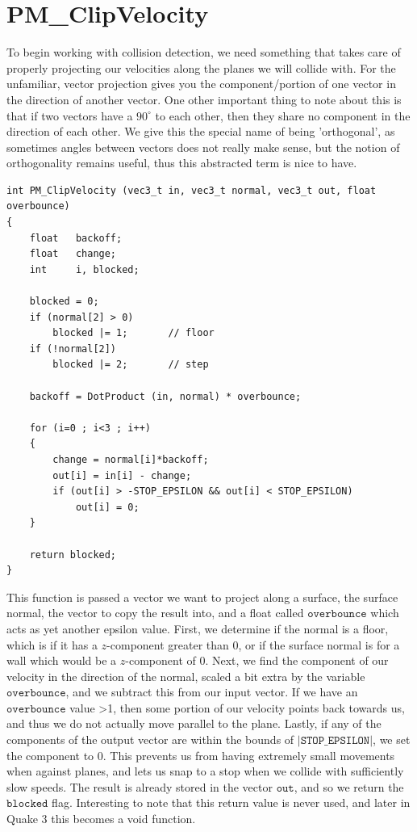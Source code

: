\documentclass{article}
\begin{document}
\section{PM\_ClipVelocity}
To begin working with collision detection, we need something that takes care of properly projecting our velocities along the planes we will collide with. For the unfamiliar, vector projection gives you the component/portion of one vector in the direction of another vector. One other important thing to note about this is that if two vectors have a $90^{\circ}$ to each other, then they share no component in the direction of each other. We give this the special name of being 'orthogonal', as sometimes angles between vectors does not really make sense, but the notion of orthogonality remains useful, thus this abstracted term is nice to have.
\begin{verbatim}
int PM_ClipVelocity (vec3_t in, vec3_t normal, vec3_t out, float overbounce)
{
	float	backoff;
	float	change;
	int		i, blocked;
	
	blocked = 0;
	if (normal[2] > 0)
		blocked |= 1;		// floor
	if (!normal[2])
		blocked |= 2;		// step
	
	backoff = DotProduct (in, normal) * overbounce;

	for (i=0 ; i<3 ; i++)
	{
		change = normal[i]*backoff;
		out[i] = in[i] - change;
		if (out[i] > -STOP_EPSILON && out[i] < STOP_EPSILON)
			out[i] = 0;
	}
	
	return blocked;
}
\end{verbatim}
This function is passed a vector we want to project along a surface, the surface normal, the vector to copy the result into, and a float called $\texttt{overbounce}$ which acts as yet another epsilon value. First, we determine if the normal is a floor, which is if it has a $z$-component greater than 0, or if the surface normal is for a wall which would  be a $z$-component of 0. Next, we find the component of our velocity in the direction of the normal, scaled a bit extra by the variable $\texttt{overbounce}$, and we subtract this from our input vector. If we have an $\texttt{overbounce}$ value >1, then some portion of our velocity points back towards us, and thus we do not actually move parallel to the plane. Lastly, if any of the components of the output vector are within the bounds of $\lvert \texttt{STOP\_EPSILON} \rvert$, we set the component to 0. This prevents us from having extremely small movements when against planes, and lets us snap to a stop when we collide with sufficiently slow speeds. The result is already stored in the vector $\texttt{out}$, and so we return the $\texttt{blocked}$ flag. Interesting to note that this return value is never used, and later in Quake 3 this becomes a void function. 
\end{document}
